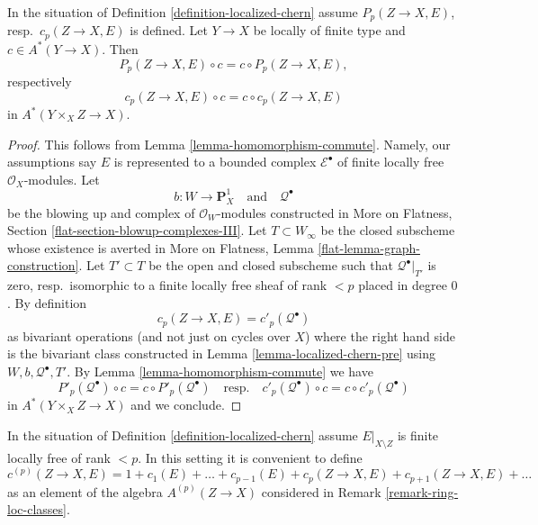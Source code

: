 \begin{lemma}
\label{lemma-loc-chern-classes-commute}
In the situation of Definition \ref{definition-localized-chern}
assume $P_p(Z \to X, E)$, resp.\ $c_p(Z \to X, E)$ is defined.
Let $Y \to X$ be locally of finite type and $c \in A^*(Y \to X)$.
Then
$$
P_p(Z \to X, E) \circ c = c \circ P_p(Z \to X, E),
$$
respectively
$$
c_p(Z \to X, E) \circ c = c \circ c_p(Z \to X, E)
$$
in $A^*(Y \times_X Z \to X)$.
\end{lemma}

\begin{proof}
This follows from Lemma \ref{lemma-homomorphism-commute}.
Namely, our assumptions say $E$
is represented to a bounded complex $\mathcal{E}^\bullet$
of finite locally free $\mathcal{O}_X$-modules. Let
$$
b : W \to \mathbf{P}^1_X
\quad\text{and}\quad
\mathcal{Q}^\bullet
$$
be the blowing up and complex of $\mathcal{O}_W$-modules constructed in
More on Flatness, Section \ref{flat-section-blowup-complexes-III}.
Let $T \subset W_\infty$ be the closed subscheme whose existence is
averted in More on Flatness, Lemma \ref{flat-lemma-graph-construction}.
Let $T' \subset T$ be the open and closed subscheme such that
$\mathcal{Q}^\bullet|_{T'}$ is zero, resp.\ isomorphic to a
finite locally free sheaf of rank $< p$ placed in degree $0$. By definition
$$
c_p(Z \to X, E) = c'_p(\mathcal{Q}^\bullet)
$$
as bivariant operations (and not just on cycles over $X$)
where the right hand side is the bivariant class constructed in
Lemma \ref{lemma-localized-chern-pre} using $W, b, \mathcal{Q}^\bullet, T'$.
By Lemma \ref{lemma-homomorphism-commute} we have
$$
P'_p(\mathcal{Q}^\bullet) \circ c = c \circ P'_p(\mathcal{Q}^\bullet)
\quad\text{resp.}\quad
c'_p(\mathcal{Q}^\bullet) \circ c = c \circ c'_p(\mathcal{Q}^\bullet)
$$
in $A^*(Y \times_X Z \to X)$ and we conclude.
\end{proof}

\begin{remark}
\label{remark-loc-chern-classes}
In the situation of Definition \ref{definition-localized-chern}
assume $E|_{X \setminus Z}$ is finite locally free of rank $< p$.
In this setting it is convenient to define
$$
c^{(p)}(Z \to X, E) = 1 + c_1(E) + \ldots + c_{p - 1}(E) +
c_p(Z \to X, E) + c_{p + 1}(Z \to X, E) + \ldots
$$
as an element of the algebra $A^{(p)}(Z \to X)$ considered in
Remark \ref{remark-ring-loc-classes}.
\end{remark}

